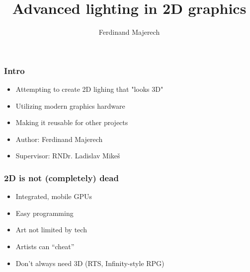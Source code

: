 \documentclass{beamer}
\begin{document}
\title{Advanced lighting in 2D graphics}
\author{Ferdinand Majerech}

\begin{frame}[plain] 
  \titlepage
\end{frame}


\begin{frame}\frametitle{Intro}

\begin{itemize}
\item
  Attempting to create 2D lighing that "looks 3D"
\item
  Utilizing modern graphics hardware
\item
  Making it reusable for other projects
\item
  Author: Ferdinand Majerech
\item
  Supervisor: RNDr. Ladislav Mikeš
\end{itemize}

\end{frame}

\begin{frame}\frametitle{2D is not (completely) dead}

\begin{itemize}
\item
  Integrated, mobile GPUs
\item
  Easy programming
\item
  Art not limited by tech
\item
  Artists can ``cheat''
\item
  Don't always need 3D (RTS, Infinity-style RPG)
\end{itemize}

\end{frame}
\end{document}
